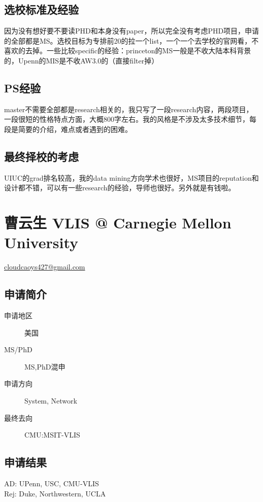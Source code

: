\documentclass[11pt,fleqn,openany]{book} %
\begin{document}
\subsection*{选校标准及经验}
因为没有想好要不要读PHD和本身没有paper，所以完全没有考虑PHD项目，申请的全部都是MS。选校目标为专排前20的拉一个list，一个一个去学校的官网看，不喜欢的去掉。一些比较specific的经验：princeton的MS一般是不收大陆本科背景的，Upenn的MIS是不收AW3.0的（直接filter掉）
\subsection*{PS经验}
master不需要全部都是research相关的，我只写了一段research内容，两段项目，一段很短的性格特点方面，大概800字左右。我的风格是不涉及太多技术细节，每段是简要的介绍，难点或者遇到的困难。
\subsection*{最终择校的考虑}
UIUC的grad排名较高，我的data mining方向学术也很好，MS项目的reputation和设计都不错，可以有一些research的经验，导师也很好。另外就是有钱啦。
\clearpage
\section{曹云生 VLIS @ Carnegie Mellon University}
\hfill \href{mailto:cloudcaoys427@gmail.com}{cloudcaoys427@gmail.com}

\noindent\begin{minipage}[t]{0.45\textwidth}
\subsection*{申请简介}
\begin{description}
\item[申请地区] 美国
\item[MS/PhD] MS,PhD混申
\item[申请方向] System, Network
\item[最终去向] CMU:MSIT-VLIS
\end{description}
\end{minipage}
\hfill
\begin{minipage}[t]{0.45\textwidth}
\subsection*{申请结果}
\noindent AD: UPenn, USC, CMU-VLIS\\
Rej: Duke, Northwestern, UCLA
\end{minipage}
\end{document}

